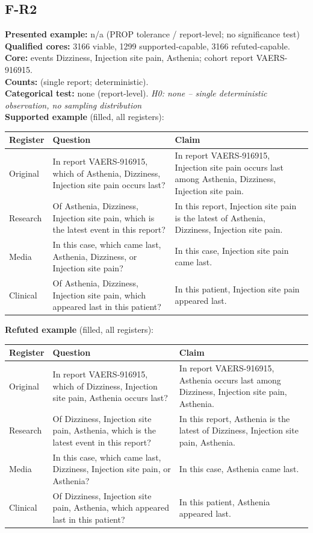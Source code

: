 \documentclass[11pt]{article}
\begin{document}
\subsection*{F-R2}
\textbf{Presented example:} n/a (PROP tolerance / report-level; no significance test) \\
\textbf{Qualified cores:} 3166 viable, 1299 supported-capable, 3166 refuted-capable. \\
\textbf{Core:} events Dizziness, Injection site pain, Asthenia; cohort report VAERS-916915. \\
\textbf{Counts:} (single report; deterministic). \\
\textbf{Categorical test:} none (report-level). \emph{H0: none -- single deterministic observation, no sampling distribution} \\
\textbf{Supported example} (filled, all registers): \\
\begin{tabularx}{\linewidth}{@{}l L L@{}}
\toprule
\textbf{Register} & \textbf{Question} & \textbf{Claim} \\
\midrule
Original & In report VAERS-916915, which of Asthenia, Dizziness, Injection site pain occurs last? & In report VAERS-916915, Injection site pain occurs last among Asthenia, Dizziness, Injection site pain. \\
Research & Of Asthenia, Dizziness, Injection site pain, which is the latest event in this report? & In this report, Injection site pain is the latest of Asthenia, Dizziness, Injection site pain. \\
Media & In this case, which came last, Asthenia, Dizziness, or Injection site pain? & In this case, Injection site pain came last. \\
Clinical & Of Asthenia, Dizziness, Injection site pain, which appeared last in this patient? & In this patient, Injection site pain appeared last. \\
\bottomrule
\end{tabularx}
\vspace{3pt}
\textbf{Refuted example} (filled, all registers): \\
\begin{tabularx}{\linewidth}{@{}l L L@{}}
\toprule
\textbf{Register} & \textbf{Question} & \textbf{Claim} \\
\midrule
Original & In report VAERS-916915, which of Dizziness, Injection site pain, Asthenia occurs last? & In report VAERS-916915, Asthenia occurs last among Dizziness, Injection site pain, Asthenia. \\
Research & Of Dizziness, Injection site pain, Asthenia, which is the latest event in this report? & In this report, Asthenia is the latest of Dizziness, Injection site pain, Asthenia. \\
Media & In this case, which came last, Dizziness, Injection site pain, or Asthenia? & In this case, Asthenia came last. \\
Clinical & Of Dizziness, Injection site pain, Asthenia, which appeared last in this patient? & In this patient, Asthenia appeared last. \\
\bottomrule
\end{tabularx}
\vspace{3pt}
\end{document}
